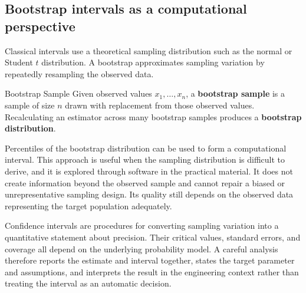 \subsection{Bootstrap intervals as a computational perspective}

Classical intervals use a theoretical sampling distribution such as the normal or Student $t$ distribution. A bootstrap approximates sampling variation by repeatedly resampling the observed data.

\begin{definition}{Bootstrap Sample}
Given observed values $x_1,\ldots,x_n$, a \textbf{bootstrap sample} is a sample of size $n$ drawn with replacement from those observed values. Recalculating an estimator across many bootstrap samples produces a \textbf{bootstrap distribution}.
\end{definition}

Percentiles of the bootstrap distribution can be used to form a computational interval. This approach is useful when the sampling distribution is difficult to derive, and it is explored through software in the practical material. It does not create information beyond the observed sample and cannot repair a biased or unrepresentative sampling design. Its quality still depends on the observed data representing the target population adequately.

Confidence intervals are procedures for converting sampling variation into a quantitative statement about precision. Their critical values, standard errors, and coverage all depend on the underlying probability model. A careful analysis therefore reports the estimate and interval together, states the target parameter and assumptions, and interprets the result in the engineering context rather than treating the interval as an automatic decision.
